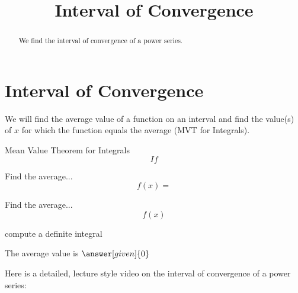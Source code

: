 \documentclass{ximera}
\title{Interval of Convergence}
\begin{document}
\begin{abstract}
We find the interval of convergence of a power series.
\end{abstract}

\maketitle

\section{Interval of Convergence}

We will find the average value of a function on an interval 
and find the value(s) of $x$ for which the function equals the 
average (MVT for Integrals).

\begin{theorem} Mean Value Theorem for Integrals 
\[
If
\]
\end{theorem}






\begin{example} %
Find the average...
 \[
  f(x) = 
  \]
\end{example}

\begin{center}
\begin{foldable}
\end{foldable}
\end{center}


\begin{problem} %
  Find the average...
  \[
  f(x)
  \]
    \begin{hint}
      compute a definite integral
    \end{hint}
    
		
		The average value is
		 $\answer[given]{0}$
\end{problem}


\begin{center}
\begin{foldable}
\end{foldable}
\end{center}

\begin{center}
\begin{foldable}
Here is a detailed, lecture style video on the interval of convergence of a power series:
\end{foldable}
\end{center}
\end{document}
